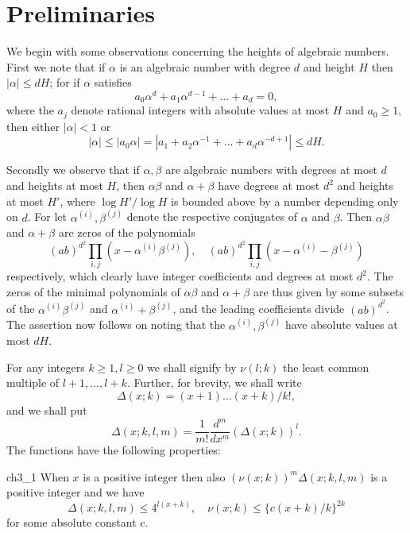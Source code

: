 \section{Preliminaries}\label{sec:ch3_2}

We begin with some observations concerning the heights of algebraic numbers. First we note that if $\alpha$ is an algebraic number with degree $d$ and height $H$ then $|\alpha| \le dH$; for if $\alpha$ satisfies
\[
a_0\alpha^d + a_1\alpha^{d-1} + \dots + a_d = 0,
\]
where the $a_j$ denote rational integers with absolute values at most $H$ and $a_0 \ge 1$, then either $|\alpha| < 1$ or
\[
|\alpha| \le |a_0\alpha| = |a_1 + a_2\alpha^{-1} + \dots + a_d\alpha^{-d+1}| \le dH.
\]

Secondly we observe that if $\alpha, \beta$ are algebraic numbers with degrees at most $d$ and heights at most $H$, then $\alpha\beta$ and $\alpha + \beta$ have degrees at most $d^2$ and heights at most $H'$, where $\log H'/\log H$ is bounded above by a number depending only on $d$. For let $\alpha^{(i)}, \beta^{(j)}$ denote the respective conjugates of $\alpha$ and $\beta$. Then $\alpha\beta$ and $\alpha + \beta$ are zeros of the polynomials
\[
(ab)^{d^2} \prod_{i,j} (x - \alpha^{(i)}\beta^{(j)}), \quad (ab)^{d^2} \prod_{i,j} (x - \alpha^{(i)} - \beta^{(j)})
\]
respectively, which clearly have integer coefficients and degrees at most $d^2$. The zeros of the minimal polynomials of $\alpha\beta$ and $\alpha + \beta$ are thus given by some subsets of the $\alpha^{(i)}\beta^{(j)}$ and $\alpha^{(i)}+\beta^{(j)}$, and the leading coefficients divide $(ab)^{d^2}$. The assertion now follows on noting that the $\alpha^{(i)}, \beta^{(j)}$ have absolute values at most $dH$.

For any integers $k \ge 1, l \ge 0$ we shall signify by $\nu(l;k)$ the least common multiple of $l+1, \dots, l+k$. Further, for brevity, we shall write
\[
\Delta(x; k) = (x+1) \dots (x+k)/k!,
\]
and we shall put
\[
\Delta(x; k, l, m) = \frac{1}{m!} \frac{d^m}{dx^m} (\Delta(x; k))^l.
\]
The functions have the following properties:

\begin{mylemma}{}{ch3_1}
When $x$ is a positive integer then also $(\nu(x;k))^m \Delta(x;k,l,m)$ is a positive integer and we have
\[
\Delta(x; k, l, m) \le 4^{l(x+k)}, \quad \nu(x; k) \le \{c(x+k)/k\}^{2k}
\]
for some absolute constant $c$.
\end{mylemma}

